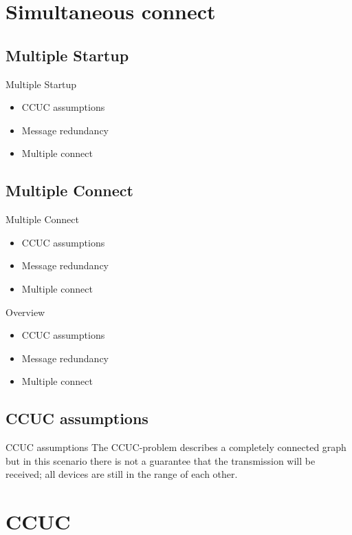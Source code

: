 \section{Simultaneous connect}
\subsection{Multiple Startup}
\begin{frame}{Multiple Startup}
  \begin{itemize}
    \item CCUC assumptions
    \item Message redundancy
    \item Multiple connect
  \end{itemize}
\end{frame}

\subsection{Multiple Connect}
\begin{frame}{Multiple Connect}
  \begin{itemize}
    \item CCUC assumptions
    \item Message redundancy
    \item Multiple connect
  \end{itemize}
\end{frame}

\begin{frame}{Overview}
  \begin{itemize}
    \item CCUC assumptions
    \item Message redundancy
    \item Multiple connect
  \end{itemize}
\end{frame}
\subsection{CCUC assumptions}
\begin{frame}{CCUC assumptions}
The CCUC-problem describes a completely connected graph but in this scenario there is not a guarantee that the transmission will be received; all devices are still in the range of each other.
\end{frame}

\section{CCUC}
